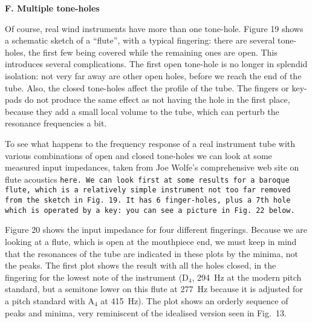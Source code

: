 
  \textbf{F. Multiple tone-holes} 

  Of course, real wind instruments have more than one tone-hole. Figure 19 
  shows a schematic sketch of a “flute”, with a typical fingering: there are 
  several tone-holes, the first few being covered while the remaining ones are 
  open. This introduces several complications. The first open tone-hole is no 
  longer in splendid isolation: not very far away are other open holes, before 
  we reach the end of the tube. Also, the closed tone-holes affect the profile 
  of the tube. The fingers or key-pads do not produce the same effect as not 
  having the hole in the first place, because they add a small local volume to 
  the tube, which can perturb the resonance frequencies a bit. 


  To see what happens to the frequency response of a real instrument tube with 
  various combinations of open and closed tone-holes we can look at some 
  measured input impedances, taken from Joe Wolfe's comprehensive web site on 
  flute acoustics \tt{}here\rm{}. We can look first at some results for a 
  baroque flute, which is a relatively simple instrument not too far removed 
  from the sketch in Fig.\ 19. It has 6 finger-holes, plus a 7th hole which is 
  operated by a key: you can see a picture in Fig.\ 22 below. 

  Figure 20 shows the input impedance for four different fingerings. Because we 
  are looking at a flute, which is open at the mouthpiece end, we must keep in 
  mind that the resonances of the tube are indicated in these plots by the 
  minima, not the peaks. The first plot shows the result with all the holes 
  closed, in the fingering for the lowest note of the instrument 
  ($\mathrm{D}_4$, 294~Hz at the modern pitch standard, but a semitone lower on 
  this flute at 277~Hz because it is adjusted for a pitch standard with 
  $\mathrm{A}_4$ at 415~Hz). The plot shows an orderly sequence of peaks and 
  minima, very reminiscent of the idealised version seen in Fig.\ 13. 

